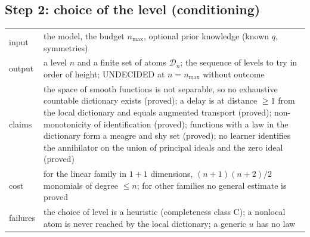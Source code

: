 \documentclass[11pt]{article}
\theoremstyle{plain}
\theoremstyle{definition}
\theoremstyle{remark}
\newcommand{\lab}[1]{\textsf{#1}}           %
\newcommand{\UND}{\lab{UNDECIDED}}
\begin{document}
\subsection*{Step 2: choice of the level (conditioning)}
\begin{tabular}{@{}p{2.2cm}p{9.6cm}@{}}
\toprule
input & the model, the budget $n_{\max}$, optional prior knowledge (known $q$, symmetries)\\
output & a level $n$ and a finite set of atoms $\mathcal D_n$; the sequence of levels to try in order of height; \UND{} at $n=n_{\max}$ without outcome\\
claims & the space of smooth functions is not separable, so no exhaustive countable dictionary exists (proved); a delay is at distance $\ge1$ from the local dictionary and equals augmented transport (proved); non-monotonicity of identification (proved); functions with a law in the dictionary form a meagre and shy set (proved); no learner identifies the annihilator on the union of principal ideals and the zero ideal (proved)\\
cost & for the linear family in $1{+}1$ dimensions, $(n+1)(n+2)/2$ monomials of degree $\le n$; for other families no general estimate is proved\\
failures & the choice of level is a heuristic (completeness class C); a nonlocal atom is never reached by the local dictionary; a generic $u$ has no law\\
\bottomrule
\end{tabular}
\end{document}
